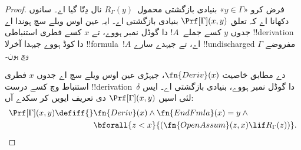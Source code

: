 \documentclass[../../../include/open-logic-section]{subfiles}
\begin{document}
\begin{proof}
  فرض کرو
  «$y \in \Gamma$»
  بنیادی بازگشتی محمول~$R_\Gamma(y)$ نال دِتّا گیا اے۔
  سانوں دکھانا اے
  کہ تعلق
  $\Prf[\Gamma](x, y)$
  بنیادی بازگشتی
  اے۔ ایہ عین
  اوس ویلے سچ
  ہوندا اے جدوں
  $y$ کسے
  جملے~$!A$ دا
  گوڈل نمبر ہووے،
  تے $x$ کسے
  فطری استنباطی
  !!{derivation}
  دا کوڈ ہووے
  جیہدا آخرلا
  !!{formula}~$!A$
  اے، تے جیہدے
  سارے !!{undischarged}
  مفروضے
  $\Gamma$ وچ
  ہون۔

  دے مطابق
  خاصیت
  $\fn{Deriv}(x)$،
  جیہڑی عین اوس
  ویلے سچ اے
  جدوں $x$
  فطری استنباط
  وچ کسے درست
  !!{derivation}~$\delta$
  دا گوڈل نمبر
  ہووے، بنیادی
  بازگشتی اے۔
  ایس لئی اسیں
  $\Prf[\Gamma](x, y)$ دی تعریف ایویں کر سکدے آں:
  \begin{align*}
    \Prf[\Gamma](x, y) \defiff {}
    & \fn{Deriv}(x) \land \fn{EndFmla}(x) = y \land {} \\
    & \bforall{z < x}{(\fn{OpenAssum}(z, x) \lif R_\Gamma(z))}.
  \end{align*}
\end{proof}
\end{document}
